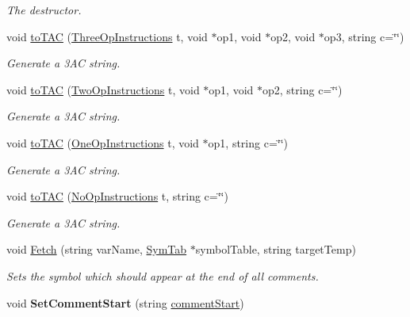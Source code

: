 \begin{DoxyCompactItemize}
\begin{DoxyCompactList}\small\item\em The destructor. \end{DoxyCompactList}\item 
void \hyperlink{classTAC__Generator_aacf385dd067825fd35a315d04ea9c78f}{to\-T\-A\-C} (\hyperlink{classTAC__Generator_ae032b80a215a10604c5273b65e7dab4c}{Three\-Op\-Instructions} t, void $\ast$op1, void $\ast$op2, void $\ast$op3, string c=\char`\"{}\char`\"{})
\begin{DoxyCompactList}\small\item\em Generate a 3\-A\-C string. \end{DoxyCompactList}\item 
void \hyperlink{classTAC__Generator_a7e5f15afb7c6b13793db76d1091f113c}{to\-T\-A\-C} (\hyperlink{classTAC__Generator_a4e5a63c4a55a85d34f6ffebe5bf48129}{Two\-Op\-Instructions} t, void $\ast$op1, void $\ast$op2, string c=\char`\"{}\char`\"{})
\begin{DoxyCompactList}\small\item\em Generate a 3\-A\-C string. \end{DoxyCompactList}\item 
void \hyperlink{classTAC__Generator_a78507356e58ed7ff406314e8ce566ad8}{to\-T\-A\-C} (\hyperlink{classTAC__Generator_ab58b7044cb5d16a454f4e01514175123}{One\-Op\-Instructions} t, void $\ast$op1, string c=\char`\"{}\char`\"{})
\begin{DoxyCompactList}\small\item\em Generate a 3\-A\-C string. \end{DoxyCompactList}\item 
void \hyperlink{classTAC__Generator_a0ee1e11b169a2ead7244c00869d66858}{to\-T\-A\-C} (\hyperlink{classTAC__Generator_a3942f3e280fb83e44ad85eb13d56dfb5}{No\-Op\-Instructions} t, string c=\char`\"{}\char`\"{})
\begin{DoxyCompactList}\small\item\em Generate a 3\-A\-C string. \end{DoxyCompactList}\item 
void \hyperlink{classTAC__Generator_aacf5782b612a76a148478154306d3216}{Fetch} (string var\-Name, \hyperlink{classSymTab}{Sym\-Tab} $\ast$symbol\-Table, string target\-Temp)
\begin{DoxyCompactList}\small\item\em Sets the symbol which should appear at the end of all comments. \end{DoxyCompactList}\item 
\hypertarget{classTAC__Generator_a8570a01bd5bf10e849017d412440799a}{void {\bfseries Set\-Comment\-Start} (string \hyperlink{classTAC__Generator_ac530666b410f226e764e9eb33b2a4666}{comment\-Start})}\label{classTAC__Generator_a8570a01bd5bf10e849017d412440799a}


\end{DoxyCompactItemize}

